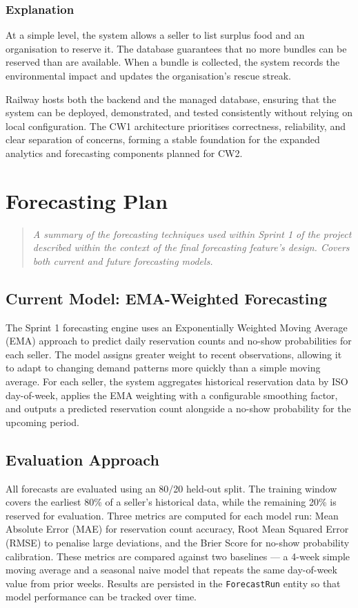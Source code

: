 \documentclass[11pt, a4paper]{report}
\newenvironment{motivation}{\begin{quotation}\noindent\small\itshape}{\end{quotation}}
\begin{document}
\subsection{Explanation}

At a simple level, the system allows a seller to list surplus food and an organisation to reserve it. The database guarantees that no more bundles can be reserved than are available. When a bundle is collected, the system records the environmental impact and updates the organisation's rescue streak.

Railway hosts both the backend and the managed database, ensuring that the system can be deployed, demonstrated, and tested consistently without relying on local configuration. The CW1 architecture prioritises correctness, reliability, and clear separation of concerns, forming a stable foundation for the expanded analytics and forecasting components planned for CW2.

\chapter{Forecasting Plan}
\begin{motivation}
A summary of the forecasting techniques used within Sprint 1 of the project described within the context of the final forecasting feature's design. Covers both current and future forecasting models.
\end{motivation}

\section{Current Model: EMA-Weighted Forecasting}
The Sprint 1 forecasting engine uses an Exponentially Weighted Moving Average (EMA) approach to predict daily reservation counts and no-show probabilities for each seller. The model assigns greater weight to recent observations, allowing it to adapt to changing demand patterns more quickly than a simple moving average. For each seller, the system aggregates historical reservation data by ISO day-of-week, applies the EMA weighting with a configurable smoothing factor, and outputs a predicted reservation count alongside a no-show probability for the upcoming period.

\section{Evaluation Approach}
All forecasts are evaluated using an 80/20 held-out split. The training window covers the earliest 80\% of a seller's historical data, while the remaining 20\% is reserved for evaluation. Three metrics are computed for each model run: Mean Absolute Error (MAE) for reservation count accuracy, Root Mean Squared Error (RMSE) to penalise large deviations, and the Brier Score for no-show probability calibration. These metrics are compared against two baselines --- a 4-week simple moving average and a seasonal naive model that repeats the same day-of-week value from prior weeks. Results are persisted in the \texttt{ForecastRun} entity so that model performance can be tracked over time.
\end{document}
